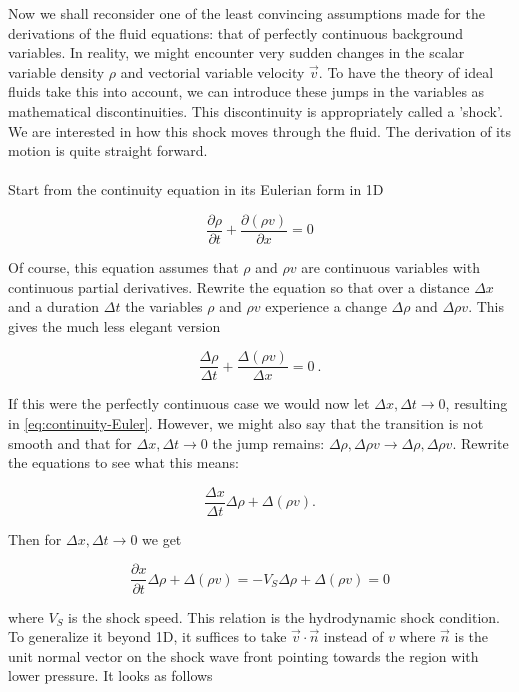 Now we shall reconsider one of the least convincing assumptions made for the derivations of the fluid equations: that of perfectly continuous background variables. In reality, we might encounter very sudden changes in the scalar variable density $\rho$ and vectorial variable velocity $\vec{v}$. To have the theory of ideal fluids take this into account, we can introduce these jumps in the variables as mathematical discontinuities. This discontinuity is appropriately called a 'shock'. We are interested in how this shock moves through the fluid. The derivation of its motion is quite straight forward.\\
\\
Start from the continuity equation in its Eulerian form in 1D

\begin{equation}
\label{eq:continuity-Euler}
\frac{\partial \rho}{\partial t} + \frac{\partial(\rho v)}{\partial x} = 0
\end{equation}

Of course, this equation assumes that $\rho$ and $\rho v$ are continuous variables with continuous partial derivatives. Rewrite the equation so that over a distance $\Delta x$ and a duration $\Delta t$ the variables $\rho$ and $\rho v$ experience a change $\Delta\rho$ and $\Delta \rho v$. This gives the much less elegant version 

$$ \frac{\Delta \rho}{\Delta t} + \frac{\Delta(\rho v)}{\Delta x} = 0 \ . $$

If this were the perfectly continuous case we would now let $\Delta x, \Delta t \to 0$, resulting in \autoref{eq:continuity-Euler}. However, we might also say that the transition is not smooth and that for $\Delta x, \Delta t \to 0$ the jump remains: $ \Delta \rho, \Delta \rho v \to \Delta \rho, \Delta \rho v $. Rewrite the equations to see what this means:

$$ \frac{\Delta x}{\Delta t} \Delta \rho + \Delta(\rho v) . $$

Then for $\Delta x, \Delta t \to 0$ we get 

\begin{equation}
\label{eq:HD-shock-condition}
\frac{\partial x}{\partial t} \Delta \rho + \Delta(\rho v) = -V_S \Delta \rho + \Delta(\rho v) = 0
\end{equation}

where $V_S$ is the shock speed. This relation is the hydrodynamic shock condition. To generalize it beyond 1D, it suffices to take $\vec{v} \cdot \vec{n}$ instead of $v$ where $\vec{n}$ is the unit normal vector on the shock wave front pointing towards the region with lower pressure. It looks as follows

